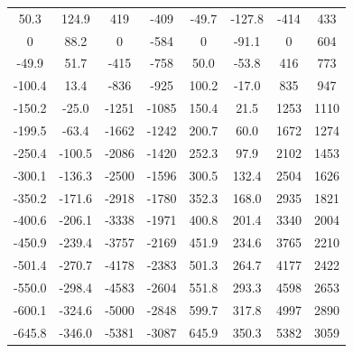 \documentclass[11pt]{article}
\begin{document}
\begin{table}[H]
\begin{tabular}{cccccccc}
        50.3   & 124.9 & 419  & -409 & -49.7  & -127.8 & -414  & 433 \\
        0      & 88.2  & 0    & -584 & 0      & -91.1  & 0     & 604 \\
        -49.9  & 51.7  & -415 & -758 & 50.0   & -53.8  & 416   & 773 \\
        -100.4 & 13.4  & -836 & -925 & 100.2  & -17.0  & 835   & 947 \\
        -150.2 & -25.0 & -1251&-1085 & 150.4  & 21.5   & 1253  & 1110 \\
        -199.5 & -63.4 & -1662&-1242 & 200.7  & 60.0   & 1672  & 1274 \\
        -250.4 & -100.5& -2086&-1420 & 252.3  & 97.9   & 2102  & 1453 \\
        -300.1 & -136.3& -2500&-1596 & 300.5  & 132.4  & 2504  & 1626 \\
        -350.2 & -171.6& -2918&-1780 & 352.3  & 168.0  & 2935  & 1821 \\
        -400.6 & -206.1& -3338&-1971 & 400.8  & 201.4  & 3340  & 2004 \\
        -450.9 & -239.4& -3757&-2169 & 451.9  & 234.6  & 3765  & 2210 \\
        -501.4 & -270.7& -4178&-2383 & 501.3  & 264.7  & 4177  & 2422 \\
        -550.0 & -298.4& -4583&-2604 & 551.8  & 293.3  & 4598  & 2653 \\
        -600.1 & -324.6& -5000&-2848 & 599.7  & 317.8  & 4997  & 2890 \\
        -645.8 & -346.0& -5381&-3087 & 645.9  & 350.3  & 5382  & 3059 \\
        \bottomrule
    \end{tabular}
\end{table}
\end{document}
